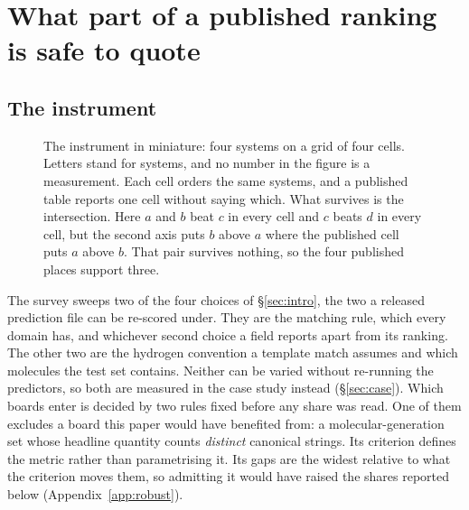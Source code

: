 \documentclass{article}
\begin{document}
\section{What part of a published ranking is safe to quote}
\label{sec:robust}\label{sec:xdomainmain}

\subsection{The instrument}
\label{sec:instrument}

\begin{figure}[t]
\centering

\caption{The instrument in miniature: four systems on a grid of four cells. Letters stand for systems,
and no number in the figure is a measurement. Each cell orders the same systems, and a published
table reports one cell without saying which. What survives is the intersection. Here $a$ and $b$
beat $c$ in every cell and $c$ beats $d$ in every cell, but the second axis puts $b$ above $a$
where the published cell puts $a$ above $b$. That pair survives nothing, so the four published
places support three.}
\label{fig:schematic}
\end{figure}

The survey sweeps two of the four choices of \S\ref{sec:intro}, the two a released prediction file
can be re-scored under. They are the matching rule, which every domain has, and whichever second
choice a field reports apart from its ranking. The other two are the hydrogen convention a template
match assumes and which molecules the test set contains. Neither can be varied without re-running
the predictors, so both are measured in the case study instead (\S\ref{sec:case}). Which boards
enter is decided by two rules fixed before any share was read. One of them excludes a board this
paper would have benefited from: a molecular-generation set whose headline quantity counts
\emph{distinct} canonical strings. Its criterion defines the metric rather than parametrising it.
Its gaps are the widest relative to what the criterion moves them, so admitting it would have
raised the shares reported below (Appendix~\ref{app:robust}).
\end{document}
